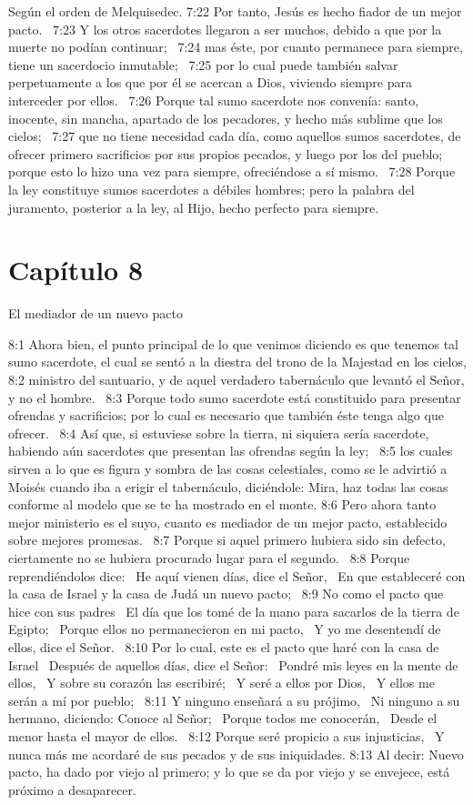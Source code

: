 Según el orden de Melquisedec. 
7:22 Por tanto, Jesús es hecho fiador de un mejor pacto.  
7:23 Y los otros sacerdotes llegaron a ser muchos, debido a que por la muerte no podían continuar;  
7:24 mas éste, por cuanto permanece para siempre, tiene un sacerdocio inmutable;  
7:25 por lo cual puede también salvar perpetuamente a los que por él se acercan a Dios, viviendo siempre para interceder por ellos.  
7:26 Porque tal sumo sacerdote nos convenía: santo, inocente, sin mancha, apartado de los pecadores, y hecho más sublime que los cielos;  
7:27 que no tiene necesidad cada día, como aquellos sumos sacerdotes, de ofrecer primero sacrificios por sus propios pecados, y luego por los del pueblo; porque esto lo hizo una vez para siempre, ofreciéndose a sí mismo.  
7:28 Porque la ley constituye sumos sacerdotes a débiles hombres; pero la palabra del juramento, posterior a la ley, al Hijo, hecho perfecto para siempre.  
\section*{Capítulo 8 }
El mediador de un nuevo pacto  

8:1 Ahora bien, el punto principal de lo que venimos diciendo es que tenemos tal sumo sacerdote, el cual se sentó a la diestra del trono de la Majestad en los cielos, 
8:2 ministro del santuario, y de aquel verdadero tabernáculo que levantó el Señor, y no el hombre.  
8:3 Porque todo sumo sacerdote está constituido para presentar ofrendas y sacrificios; por lo cual es necesario que también éste tenga algo que ofrecer.  
8:4 Así que, si estuviese sobre la tierra, ni siquiera sería sacerdote, habiendo aún sacerdotes que presentan las ofrendas según la ley;  
8:5 los cuales sirven a lo que es figura y sombra de las cosas celestiales, como se le advirtió a Moisés cuando iba a erigir el tabernáculo, diciéndole: Mira, haz todas las cosas conforme al modelo que se te ha mostrado en el monte. 
8:6 Pero ahora tanto mejor ministerio es el suyo, cuanto es mediador de un mejor pacto, establecido sobre mejores promesas.  
8:7 Porque si aquel primero hubiera sido sin defecto, ciertamente no se hubiera procurado lugar para el segundo.  
8:8 Porque reprendiéndolos dice:  
He aquí vienen días, dice el Señor,  
En que estableceré con la casa de Israel y la casa de Judá un nuevo pacto;  
8:9 No como el pacto que hice con sus padres  
El día que los tomé de la mano para sacarlos de la tierra de Egipto;  
Porque ellos no permanecieron en mi pacto,  
Y yo me desentendí de ellos, dice el Señor.  
8:10 Por lo cual, este es el pacto que haré con la casa de Israel  
Después de aquellos días, dice el Señor:  
Pondré mis leyes en la mente de ellos,  
Y sobre su corazón las escribiré;  
Y seré a ellos por Dios,  
Y ellos me serán a mí por pueblo;  
8:11 Y ninguno enseñará a su prójimo,  
Ni ninguno a su hermano, diciendo: Conoce al Señor;  
Porque todos me conocerán,  
Desde el menor hasta el mayor de ellos.  
8:12 Porque seré propicio a sus injusticias,  
Y nunca más me acordaré de sus pecados y de sus iniquidades. 
8:13 Al decir: Nuevo pacto, ha dado por viejo al primero; y lo que se da por viejo y se envejece, está próximo a desaparecer.  
